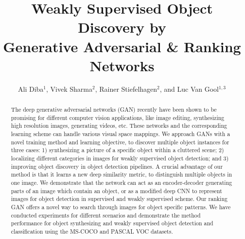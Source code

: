 \documentclass[runningheads]{llncs}
\begin{document}
\pagestyle{headings}
\mainmatter

\title{Weakly Supervised Object Discovery by \\ Generative Adversarial \& Ranking Networks} 



\author{Ali Diba$^{1}$, Vivek Sharma$^{2}$, Rainer Stiefelhagen$^{2}$, and Luc Van Gool$^{1,3}$}








\maketitle


\begin{abstract}
The deep generative adversarial networks (GAN) recently have been shown to be promising for different computer vision applications, like image editing, synthesizing high resolution images, generating videos, etc. These networks and the corresponding learning scheme can handle various visual space mappings. We approach GANs with a novel training method and learning objective, to discover multiple object instances for three cases: 1) synthesizing a picture of a specific object within a cluttered scene; 2)  localizing different categories in images for weakly supervised object detection; and 3) improving object discovery in object detection pipelines. A crucial advantage of our method is that it learns a new deep similarity metric, to distinguish multiple objects in one image. We demonstrate that the network can act as an encoder-decoder generating parts of an image which contain an object, or as a modified deep CNN to represent images for object detection in supervised and weakly supervised scheme. Our ranking GAN offers a novel way to search through images for object specific  patterns. We have conducted experiments for different scenarios and demonstrate the method performance for object synthesizing and weakly supervised object detection and classification using the MS-COCO and PASCAL VOC datasets.
\end{abstract}
\end{document}
